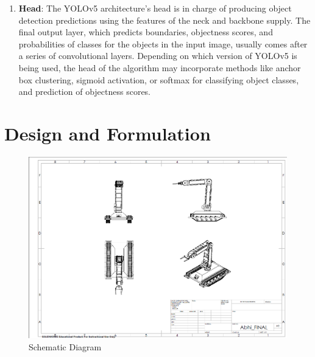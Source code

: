 \documentclass[12pt,a4paper]{report}
\begin{document}
\begin{enumerate}
\begin{enumerate}
   \end{enumerate}
    \item {\bf{Head}}: The YOLOv5 architecture's head is in charge of producing object detection predictions using the features of the neck and backbone supply. The final output layer, which predicts boundaries, objectness scores, and probabilities of classes for the objects in the input image, usually comes after a series of convolutional layers. Depending on which version of YOLOv5 is being used, the head of the algorithm may incorporate methods like anchor box clustering, sigmoid activation, or softmax for classifying object classes, and prediction of objectness scores.
\end{enumerate}

\newpage
\section {Design and Formulation}
\begin{figure}[H]
\begin{center}
\includegraphics[scale=0.5]{images/design/schematic_diag.png}
\caption{Schematic Diagram}
\end{center}
\end{figure}
\end{document}
